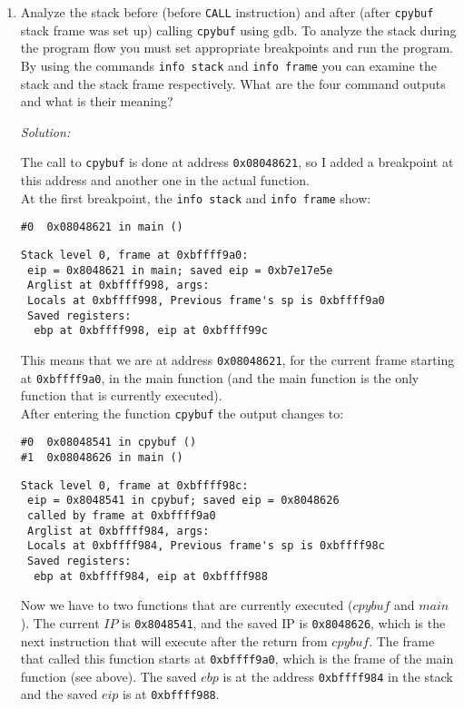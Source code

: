 \documentclass[a4paper,11pt]{article}
\newenvironment{solution}%
{\par{\noindent\small\textit{Solution:}}\vspace{-12pt}\begin{framed}}%
{\end{framed}\par}
\begin{document}
\begin{enumerate}
\item Analyze the stack before (before \texttt{CALL} instruction) and after
(after \texttt{cpybuf} stack frame was set up) calling \texttt{cpybuf} using gdb.
To analyze the stack during the program flow you must set appropriate breakpoints
and run the program. By using the commands \texttt{info stack} and \texttt{info
frame} you can examine the stack and the stack frame respectively. What are the
four command outputs and what is their meaning?
\ifsolution
\begin{solution}
The call to \texttt{cpybuf} is done at address \texttt{0x08048621}, so I added a breakpoint
at this address and another one in the actual function.\\
At the first breakpoint, the \texttt{info stack} and \texttt{info frame} show:
\begin{lstlisting}
#0  0x08048621 in main ()
\end{lstlisting}

\begin{lstlisting}
Stack level 0, frame at 0xbffff9a0:
 eip = 0x8048621 in main; saved eip = 0xb7e17e5e
 Arglist at 0xbffff998, args: 
 Locals at 0xbffff998, Previous frame's sp is 0xbffff9a0
 Saved registers:
  ebp at 0xbffff998, eip at 0xbffff99c
\end{lstlisting}

This means that we are at address \texttt{0x08048621}, for the current frame starting at
\texttt{0xbffff9a0}, in the main function (and the main function
is the only function that is currently executed).\\

After entering the function \texttt{cpybuf} the output changes to:
\begin{lstlisting}
#0  0x08048541 in cpybuf ()
#1  0x08048626 in main ()
\end{lstlisting}

\begin{lstlisting}
Stack level 0, frame at 0xbffff98c:
 eip = 0x8048541 in cpybuf; saved eip = 0x8048626
 called by frame at 0xbffff9a0
 Arglist at 0xbffff984, args: 
 Locals at 0xbffff984, Previous frame's sp is 0xbffff98c
 Saved registers:
  ebp at 0xbffff984, eip at 0xbffff988
\end{lstlisting}

Now we have to two functions that are currently executed ($cpybuf$ and $main$).
The current $IP$ is \texttt{0x8048541}, and the saved IP is \texttt{0x8048626},
which is the next instruction that will execute after the return from $cpybuf$.
The frame that called this function starts at \texttt{0xbffff9a0}, which is the frame
of the main function (see above). The saved $ebp$ is at the address \texttt{0xbffff984} in
the stack and the saved $eip$ is at \texttt{0xbffff988}.


\end{solution}
\end{enumerate}
\end{document}
